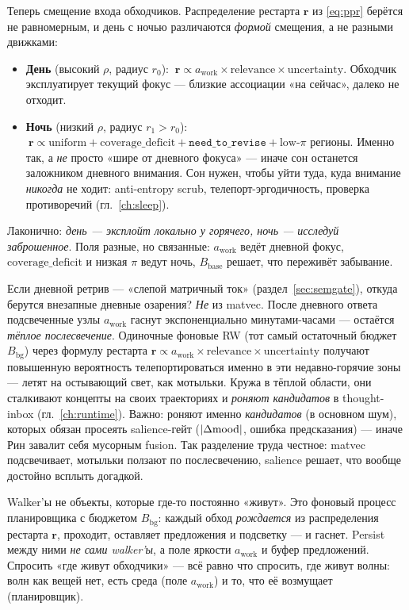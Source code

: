 Теперь смещение входа обходчиков. Распределение рестарта $\mathbf{r}$ из \eqref{eq:ppr}
берётся не равномерным, и день с ночью различаются \emph{формой} смещения, а не разными
движками:
\begin{itemize}\itemsep2pt
\item \textbf{День} (высокий $\rho$, радиус $r_0$): $\ \mathbf{r}\propto
a_{\text{work}}\times\text{relevance}\times\text{uncertainty}$. Обходчик эксплуатирует
текущий фокус — близкие ассоциации «на сейчас», далеко не отходит.
\item \textbf{Ночь} (низкий $\rho$, радиус $r_1>r_0$): $\ \mathbf{r}\propto
\text{uniform}+\text{coverage\_deficit}+\texttt{need\_to\_revise}+\text{low-}\pi\text{ регионы}$.
Именно так, а \emph{не} просто «шире от дневного фокуса» — иначе сон останется
заложником дневного внимания. Сон нужен, чтобы уйти туда, куда внимание \emph{никогда}
не ходит: anti-entropy scrub, телепорт-эргодичность, проверка противоречий
(гл.~\ref{ch:sleep}).
\end{itemize}
Лаконично: \emph{день — эксплойт локально у горячего, ночь — исследуй заброшенное}. Поля
разные, но связанные: $a_{\text{work}}$ ведёт дневной фокус, $\text{coverage\_deficit}$
и низкая $\pi$ ведут ночь, $B_{\text{base}}$ решает, что переживёт забывание.

\begin{intuition}
Если дневной ретрив — «слепой матричный ток» (раздел~\ref{sec:semgate}), откуда берутся
внезапные дневные озарения? \emph{Не} из matvec. После дневного ответа подсвеченные узлы
$a_{\text{work}}$ гаснут экспоненциально минутами-часами — остаётся \emph{тёплое
послесвечение}. Одиночные фоновые RW (тот самый остаточный бюджет $B_{\text{bg}}$)
через формулу рестарта $\mathbf{r}\propto a_{\text{work}}\times\text{relevance}\times
\text{uncertainty}$ получают повышенную вероятность телепортироваться именно в эти
недавно-горячие зоны — летят на остывающий свет, как мотыльки. Кружа в тёплой области,
они сталкивают концепты на своих траекториях и \emph{роняют кандидатов} в thought-inbox
(гл.~\ref{ch:runtime}). Важно: роняют именно \emph{кандидатов} (в основном шум), которых
обязан просеять salience-гейт ($|\Delta\mathrm{mood}|$, ошибка предсказания) — иначе Рин завалит
себя мусорным fusion. Так разделение труда честное: matvec подсвечивает, мотыльки ползают
по послесвечению, salience решает, что вообще достойно всплыть догадкой.
\end{intuition}

\begin{intuition}
Walker'ы не объекты, которые где-то постоянно «живут». Это фоновый процесс
планировщика с бюджетом $B_{\text{bg}}$: каждый обход \emph{рождается} из распределения
рестарта $\mathbf{r}$, проходит, оставляет предложения и подсветку — и гаснет.
Persist между ними \emph{не сами walker'ы}, а поле яркости $a_{\text{work}}$ и буфер
предложений. Спросить «где живут обходчики» — всё равно что спросить, где живут волны:
волн как вещей нет, есть среда (поле $a_{\text{work}}$) и то, что её возмущает
(планировщик).
\end{intuition}

